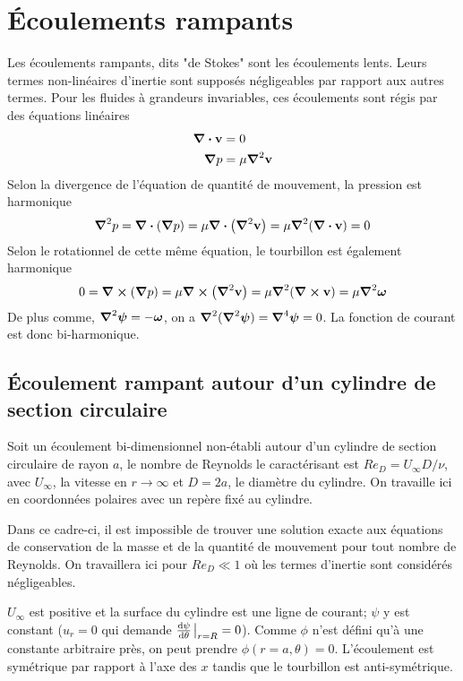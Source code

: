 
\chapter{Écoulements rampants}
  Les écoulements rampants, dits "de Stokes" sont les écoulements lents. Leurs termes non-linéaires d'inertie sont supposés négligeables par rapport aux autres termes. Pour les fluides à grandeurs invariables, ces écoulements sont régis par des équations linéaires
  \begin{equation}
    \begin{aligned}
      \div \vb{v} &= 0\\
      \grad p &= \mu \grad^2 \vb{v}
    \end{aligned}
  \end{equation}
  Selon la divergence de l'équation de quantité de mouvement, la pression est harmonique
  \begin{equation}
    \grad^2 p = \div (\grad p) = \mu \div (\grad^2 \vb{v}) = \mu \grad^2(\div \vb{v}) = 0
  \end{equation}
  Selon le rotationnel de cette même équation, le tourbillon est également harmonique
  \begin{equation}
    0 = \curl(\grad p) = \mu \curl (\grad^2 \vb{v}) = \mu \grad^2 (\curl \vb{v}) = \mu \grad^2 \boldsymbol{\omega}
  \end{equation}
  De plus comme, $\grad^2 \boldsymbol{\psi} = -\boldsymbol{\omega}$, on a $\grad^2(\grad^2 \boldsymbol{\psi}) = \grad^4 \boldsymbol{\psi}= 0$. La fonction de courant est donc bi-harmonique.

  \section{Écoulement rampant autour d'un cylindre de section circulaire}
    Soit un écoulement bi-dimensionnel non-établi autour d'un cylindre de section circulaire de rayon $a$, le nombre de Reynolds le caractérisant est $Re_D = U_{\infty}D/\nu$, avec $U_{\infty}$, la vitesse en $r\rightarrow\infty$ et $D = 2a$, le diamètre du cylindre. On travaille ici en coordonnées polaires avec un repère fixé au cylindre.

    Dans ce cadre-ci, il est impossible de trouver une solution exacte aux équations de conservation de la masse et de la quantité de mouvement pour tout nombre de Reynolds. On travaillera ici pour $Re_D \ll 1$ où les termes d'inertie sont considérés négligeables.

    $U_\infty$ est positive et la surface du cylindre est une ligne de courant; $\psi$ y est constant ($u_r = 0$ qui demande $\dv{\psi}{\theta}\eval_{r=R}=0$). Comme $\phi$ n'est défini qu'à une constante arbitraire près, on peut prendre $\phi(r=a, \theta) = 0$. L'écoulement est symétrique par rapport à l'axe des $x$ tandis que le tourbillon est anti-symétrique.

